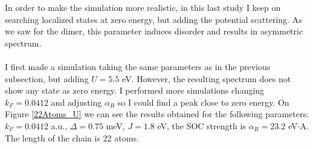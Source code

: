\documentclass[letterpaper,12pt]{article}
\begin{document}
In order to make the simulation more realistic, in this last study I keep on searching localized states at zero energy, but adding the potential scattering. As we saw for the dimer, this parameter induces disorder and results in asymmetric spectrum.\\ \\
I first made a simulation taking the same parameters as in the previous subsection, but adding $U = 5.5$ eV. However, the resulting spectrum does not show any state as zero energy. I performed more simulations changing $k_F = 0.0412$ and adjusting $\alpha_R$ so I could find a peak close to zero energy. On Figure \ref{22Atoms_U} we can see the results obtained for the following parameters: $k_F = 0.0412$ a.u., $\Delta = 0.75$ meV, $J = 1.8$ eV, the SOC strength is $\alpha_R = 23.2$ eV$\cdot$A. The length of the chain is 22 atoms.\\ \\ 
\end{document}
